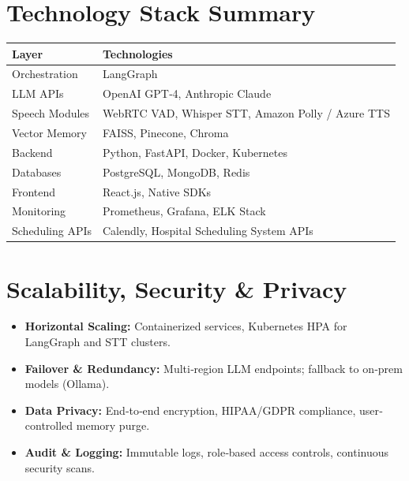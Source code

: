 \documentclass[11pt,a4paper]{article}
\begin{document}
\section{Technology Stack Summary}
\begin{tabular}{@{}ll@{}}
\toprule
\textbf{Layer} & \textbf{Technologies} \\
\midrule
Orchestration & LangGraph \\
LLM APIs & OpenAI GPT‐4, Anthropic Claude \\
Speech Modules & WebRTC VAD, Whisper STT, Amazon Polly / Azure TTS \\
Vector Memory & FAISS, Pinecone, Chroma \\
Backend & Python, FastAPI, Docker, Kubernetes \\
Databases & PostgreSQL, MongoDB, Redis \\
Frontend & React.js, Native SDKs \\
Monitoring & Prometheus, Grafana, ELK Stack \\
Scheduling APIs & Calendly, Hospital Scheduling System APIs \\
\bottomrule
\end{tabular}

\section{Scalability, Security \& Privacy}
\begin{itemize}[left=0pt]
  \item \textbf{Horizontal Scaling:} Containerized services, Kubernetes HPA for LangGraph and STT clusters.
  \item \textbf{Failover \& Redundancy:} Multi‐region LLM endpoints; fallback to on‐prem models (Ollama).
  \item \textbf{Data Privacy:} End‐to‐end encryption, HIPAA/GDPR compliance, user‐controlled memory purge.
  \item \textbf{Audit \& Logging:} Immutable logs, role‐based access controls, continuous security scans.
\end{itemize}

\end{document}
